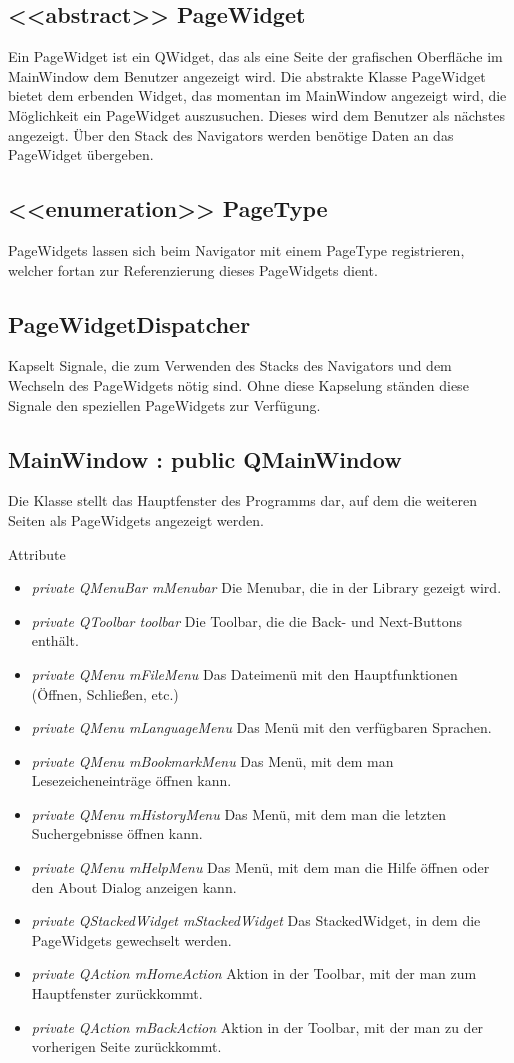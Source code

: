 \subsection*{<<abstract>> PageWidget}
Ein PageWidget ist ein QWidget, das als eine Seite der grafischen Oberfläche im MainWindow dem Benutzer angezeigt wird. Die abstrakte Klasse PageWidget bietet dem erbenden Widget, das momentan im MainWindow angezeigt wird, die Möglichkeit ein PageWidget auszusuchen. Dieses wird dem Benutzer als nächstes angezeigt. Über den Stack des Navigators werden benötige Daten an das PageWidget übergeben.

\subsection*{<<enumeration>> PageType}
PageWidgets lassen sich beim Navigator mit einem PageType registrieren, welcher fortan zur Referenzierung dieses PageWidgets dient.

\subsection*{PageWidgetDispatcher}
Kapselt Signale, die zum Verwenden des Stacks des Navigators und dem Wechseln des PageWidgets nötig sind. Ohne diese Kapselung ständen diese Signale den speziellen PageWidgets zur Verfügung.

\subsection*{MainWindow : public QMainWindow}
Die Klasse stellt das Hauptfenster des Programms dar, auf dem die weiteren Seiten als PageWidgets angezeigt werden.

Attribute
\begin{itemize}
	\item\textit{private QMenuBar mMenubar}
	Die Menubar, die in der Library gezeigt wird.   
	\item\textit{private QToolbar toolbar}
	Die Toolbar, die die Back- und Next-Buttons enthält.
	\item\textit{private QMenu mFileMenu}
	Das Dateimenü mit den Hauptfunktionen (Öffnen, Schließen, etc.)
	\item\textit{private QMenu mLanguageMenu}
	Das Menü mit den verfügbaren Sprachen.
	\item\textit{private QMenu mBookmarkMenu}
	Das Menü, mit dem man Lesezeicheneinträge öffnen kann.
	\item\textit{private QMenu mHistoryMenu}
	Das Menü, mit dem man die letzten Suchergebnisse öffnen kann.
	\item\textit{private QMenu mHelpMenu}
	Das Menü, mit dem man die Hilfe öffnen oder den About Dialog anzeigen kann.
	\item\textit{private QStackedWidget mStackedWidget}
	Das StackedWidget, in dem die PageWidgets gewechselt werden.
	\item\textit{private QAction mHomeAction}
	Aktion in der Toolbar, mit der man zum Hauptfenster zurückkommt.
	\item\textit{private QAction mBackAction}
	Aktion in der Toolbar, mit der man zu der vorherigen Seite zurückkommt.
\end{itemize}

